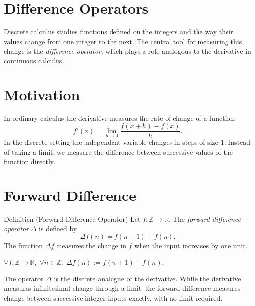 
\section{Difference Operators}
\label{sec:difference-operators}

Discrete calculus studies functions defined on the integers and the way
their values change from one integer to the next. The central tool for
measuring this change is the \emph{difference operator}, which plays a role
analogous to the derivative in continuous calculus.

\section*{Motivation}

In ordinary calculus the derivative measures the rate of change of a function:
\[
f'(x) = \lim_{h\to 0} \frac{f(x+h)-f(x)}{h}.
\]
In the discrete setting the independent variable changes in steps of size
\(1\). Instead of taking a limit, we measure the difference between
successive values of the function directly.

\section*{Forward Difference}

\begin{definitionbox}{Definition (Forward Difference Operator)}
Let \(f : \mathbb{Z} \to \mathbb{R}\).
The \emph{forward difference operator} \(\Delta\) is defined by
\[
\Delta f(n) = f(n+1) - f(n).
\]
The function \(\Delta f\) measures the change in \(f\) when the input
increases by one unit.
\end{definitionbox}
\label{def:forward-difference}

\begin{remark*}
\(\forall f : \mathbb{Z}\to\mathbb{R},\; \forall n \in \mathbb{Z}:\;
\Delta f(n) := f(n+1) - f(n)\).
\end{remark*}

\begin{remark*}
The operator \(\Delta\) is the discrete analogue of the derivative.
While the derivative measures infinitesimal change through a limit,
the forward difference measures change between successive integer inputs
exactly, with no limit required.
\end{remark*}

